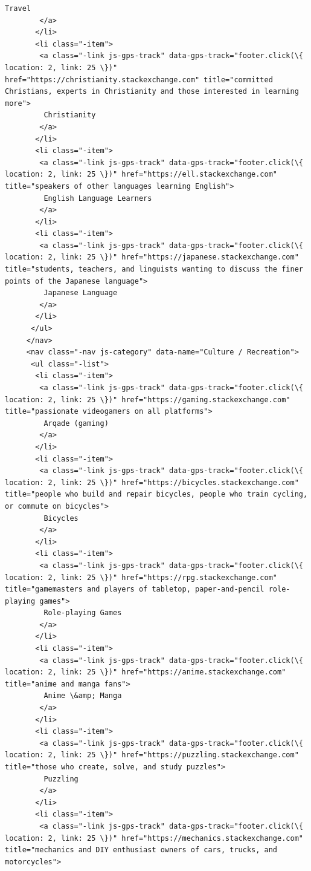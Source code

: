 \documentclass[11pt]{article}
\begin{document}
\begin{Verbatim}[commandchars=\\\{\}]
         Travel
        </a>
       </li>
       <li class="-item">
        <a class="-link js-gps-track" data-gps-track="footer.click(\{ location: 2, link: 25 \})" href="https://christianity.stackexchange.com" title="committed Christians, experts in Christianity and those interested in learning more">
         Christianity
        </a>
       </li>
       <li class="-item">
        <a class="-link js-gps-track" data-gps-track="footer.click(\{ location: 2, link: 25 \})" href="https://ell.stackexchange.com" title="speakers of other languages learning English">
         English Language Learners
        </a>
       </li>
       <li class="-item">
        <a class="-link js-gps-track" data-gps-track="footer.click(\{ location: 2, link: 25 \})" href="https://japanese.stackexchange.com" title="students, teachers, and linguists wanting to discuss the finer points of the Japanese language">
         Japanese Language
        </a>
       </li>
      </ul>
     </nav>
     <nav class="-nav js-category" data-name="Culture / Recreation">
      <ul class="-list">
       <li class="-item">
        <a class="-link js-gps-track" data-gps-track="footer.click(\{ location: 2, link: 25 \})" href="https://gaming.stackexchange.com" title="passionate videogamers on all platforms">
         Arqade (gaming)
        </a>
       </li>
       <li class="-item">
        <a class="-link js-gps-track" data-gps-track="footer.click(\{ location: 2, link: 25 \})" href="https://bicycles.stackexchange.com" title="people who build and repair bicycles, people who train cycling, or commute on bicycles">
         Bicycles
        </a>
       </li>
       <li class="-item">
        <a class="-link js-gps-track" data-gps-track="footer.click(\{ location: 2, link: 25 \})" href="https://rpg.stackexchange.com" title="gamemasters and players of tabletop, paper-and-pencil role-playing games">
         Role-playing Games
        </a>
       </li>
       <li class="-item">
        <a class="-link js-gps-track" data-gps-track="footer.click(\{ location: 2, link: 25 \})" href="https://anime.stackexchange.com" title="anime and manga fans">
         Anime \&amp; Manga
        </a>
       </li>
       <li class="-item">
        <a class="-link js-gps-track" data-gps-track="footer.click(\{ location: 2, link: 25 \})" href="https://puzzling.stackexchange.com" title="those who create, solve, and study puzzles">
         Puzzling
        </a>
       </li>
       <li class="-item">
        <a class="-link js-gps-track" data-gps-track="footer.click(\{ location: 2, link: 25 \})" href="https://mechanics.stackexchange.com" title="mechanics and DIY enthusiast owners of cars, trucks, and motorcycles">

\end{Verbatim}
\end{document}
